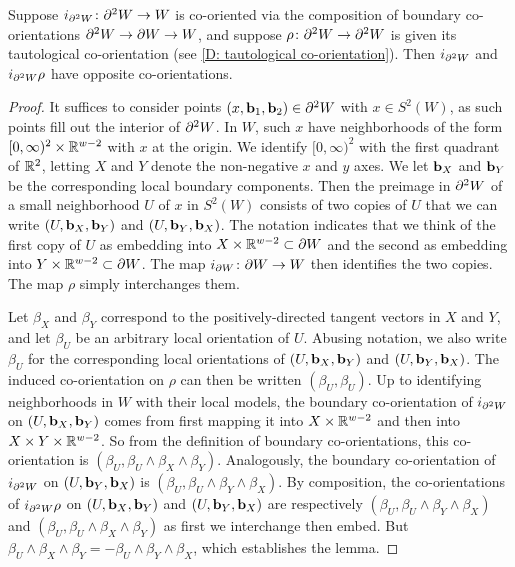 \begin{lemma}\label{L: boundary2}
	Suppose $i_{\partial^2 W} \colon \partial^2 W \to W$ is co-oriented via the composition of boundary co-orientations $\partial^2 W \to \partial W \to W$, and suppose $\rho \colon \partial^2 W \to \partial^2 W$ is given its tautological co-orientation (see \cref{D: tautological co-orientation}).
	Then $i_{\partial^2 W}$ and $i_{\partial^2 W}\rho$ have opposite co-orientations.
\end{lemma}

\begin{proof}
	It suffices to consider points $(x,\mathbf{b}_1,\mathbf{b}_2) \in \partial^2 W$ with $x \in S^2(W)$, as such points fill out the interior of $\partial^2 W$.
	In $W$, such $x$ have neighborhoods of the form $[0,\infty)^2 \times \mathbb{R}^{w-2}$ with $x$ at the origin.
	We identify $[0,\infty)^2$ with the first quadrant of $\mathbb{R}^2$, letting $X$ and $Y$ denote the non-negative $x$ and $y$ axes.
	We let $\mathbf{b}_X$ and $\mathbf{b}_Y$ be the corresponding local boundary components.
	Then the preimage in $\partial^2 W$ of a small neighborhood $U$ of $x$ in $S^2(W)$ consists of two copies of $U$ that we can write $(U,\mathbf{b}_X,\mathbf{b}_Y)$ and $(U,\mathbf{b}_Y,\mathbf{b}_X)$.
	The notation indicates that we think of the first copy of $U$ as embedding into $X \times \mathbb{R}^{w-2} \subset \partial W$ and the second as embedding into $Y \times \mathbb{R}^{w-2} \subset \partial W$.
	The map $i_{\partial W} \colon \partial W \to W$ then identifies the two copies.
	The map $\rho$ simply interchanges them.

	Let $\beta_X$ and $\beta_Y$ correspond to the positively-directed tangent vectors in $X$ and $Y$, and let $\beta_U$ be an arbitrary local orientation of $U$.
	Abusing notation, we also write $\beta_U$ for the corresponding local orientations of $(U,\mathbf{b}_X,\mathbf{b}_Y)$ and $(U,\mathbf{b}_Y,\mathbf{b}_X)$.
	The induced co-orientation on $\rho$ can then be written $(\beta_U,\beta_U)$.
	Up to identifying neighborhoods in $W$ with their local models, the boundary co-orientation of $i_{\partial^2 W}$ on $(U,\mathbf{b}_X,\mathbf{b}_Y)$ comes from first mapping it into $X \times \mathbb{R}^{w-2}$ and then into $X \times Y \times \mathbb{R}^{w-2}$.
	So from the definition of boundary co-orientations, this co-orientation is $(\beta_U, \beta_U \wedge \beta_X \wedge \beta_Y)$.
	Analogously, the boundary co-orientation of $i_{\partial^2 W}$ on $(U,\mathbf{b}_Y,\mathbf{b}_X)$ is $(\beta_U, \beta_U \wedge \beta_Y \wedge \beta_X)$.
	By composition, the co-orientations of $i_{\partial^2 W}\rho$ on $(U,\mathbf{b}_X,\mathbf{b}_Y)$ and $(U,\mathbf{b}_Y,\mathbf{b}_X)$ are respectively $(\beta_U, \beta_U \wedge \beta_Y \wedge \beta_X)$ and $(\beta_U, \beta_U \wedge \beta_X \wedge \beta_Y)$ as first we interchange then embed.
	But $\beta_U \wedge \beta_X \wedge \beta_Y = -\beta_U \wedge \beta_Y \wedge \beta_X$, which establishes the lemma.
\end{proof}

